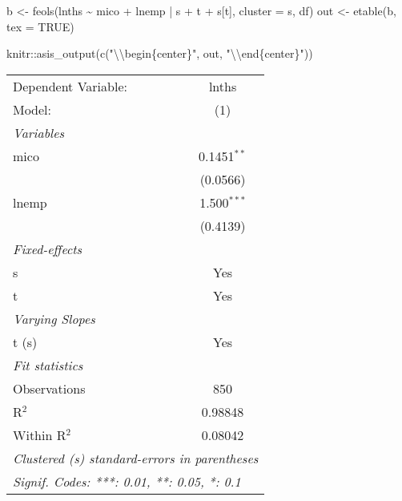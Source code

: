 \documentclass[
]{article}
\newenvironment{Shaded}{\begin{snugshade}}{\end{snugshade}}
\newcommand{\AttributeTok}[1]{\textcolor[rgb]{0.77,0.63,0.00}{#1}}
\newcommand{\ConstantTok}[1]{\textcolor[rgb]{0.00,0.00,0.00}{#1}}
\newcommand{\FunctionTok}[1]{\textcolor[rgb]{0.00,0.00,0.00}{#1}}
\newcommand{\NormalTok}[1]{#1}
\newcommand{\OtherTok}[1]{\textcolor[rgb]{0.56,0.35,0.01}{#1}}
\newcommand{\SpecialCharTok}[1]{\textcolor[rgb]{0.00,0.00,0.00}{#1}}
\newcommand{\StringTok}[1]{\textcolor[rgb]{0.31,0.60,0.02}{#1}}
\begin{document}
\begin{Shaded}
\begin{Highlighting}[]
\NormalTok{b }\OtherTok{\textless{}{-}} \FunctionTok{feols}\NormalTok{(lnths }\SpecialCharTok{\textasciitilde{}}\NormalTok{ mico }\SpecialCharTok{+}\NormalTok{ lnemp }\SpecialCharTok{|}\NormalTok{ s }\SpecialCharTok{+}\NormalTok{ t }\SpecialCharTok{+}\NormalTok{ s[t], }\AttributeTok{cluster =} \StringTok{\textquotesingle{}s\textquotesingle{}}\NormalTok{, df)}
\NormalTok{out }\OtherTok{\textless{}{-}} \FunctionTok{etable}\NormalTok{(b, }\AttributeTok{tex =} \ConstantTok{TRUE}\NormalTok{) }
\end{Highlighting}
\end{Shaded}

\begin{Shaded}
\begin{Highlighting}[]
\NormalTok{knitr}\SpecialCharTok{::}\FunctionTok{asis\_output}\NormalTok{(}\FunctionTok{c}\NormalTok{(}\StringTok{"}\SpecialCharTok{\textbackslash{}\textbackslash{}}\StringTok{begin\{center\}"}\NormalTok{, out, }\StringTok{"}\SpecialCharTok{\textbackslash{}\textbackslash{}}\StringTok{end\{center\}"}\NormalTok{)) }
\end{Highlighting}
\end{Shaded}

\begin{center}\begingroup\centering\begin{tabular}{lc}   \tabularnewline \midrule \midrule   Dependent Variable: & lnths\\     Model:              & (1)\\     \midrule   \emph{Variables}\\   mico                & 0.1451$^{**}$\\                          & (0.0566)\\      lnemp               & 1.500$^{***}$\\                          & (0.4139)\\      \midrule   \emph{Fixed-effects}\\   s                   & Yes\\     t                   & Yes\\     \midrule   \emph{Varying Slopes}\\   t (s)               & Yes\\     \midrule   \emph{Fit statistics}\\   Observations        & 850\\     R$^2$               & 0.98848\\     Within R$^2$        & 0.08042\\     \midrule \midrule   \multicolumn{2}{l}{\emph{Clustered (s) standard-errors in parentheses}}\\   \multicolumn{2}{l}{\emph{Signif. Codes: ***: 0.01, **: 0.05, *: 0.1}}\\\end{tabular}\par\endgroup\end{center}
\end{document}
